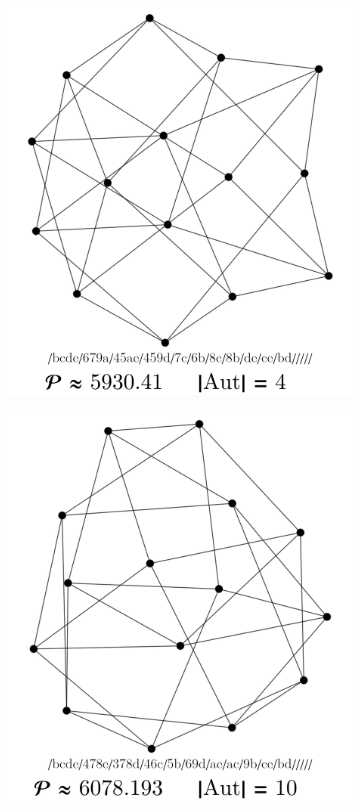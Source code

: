 \documentclass[11pt,a4paper]{article}
\renewcommand{\|}{\rule[-0.4ex]{0.2ex}{1.2em}}
\begin{document}
\begin{figure}[htb]
	\begin{subfigure}[b]{.24 \textwidth}
		\includegraphics[width=\linewidth]{smallest_13_1}
		\subcaption{}
	\end{subfigure}
	\begin{subfigure}[b]{.24 \textwidth}
		\includegraphics[width=\linewidth]{smallest_13_2}

\end{subfigure}
\end{figure}
\end{document}
